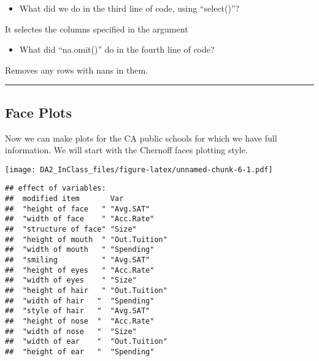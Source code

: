 \documentclass[]{article}
\newenvironment{Shaded}{\begin{snugshade}}{\end{snugshade}}
\newcommand{\DataTypeTok}[1]{\textcolor[rgb]{0.13,0.29,0.53}{#1}}
\newcommand{\KeywordTok}[1]{\textcolor[rgb]{0.13,0.29,0.53}{\textbf{#1}}}
\newcommand{\NormalTok}[1]{#1}
\newcommand{\OperatorTok}[1]{\textcolor[rgb]{0.81,0.36,0.00}{\textbf{#1}}}
\newcommand{\StringTok}[1]{\textcolor[rgb]{0.31,0.60,0.02}{#1}}
\providecommand{\tightlist}{%
  \setlength{\itemsep}{0pt}\setlength{\parskip}{0pt}}
\begin{document}
\begin{itemize}
\tightlist
\item
  What did we do in the third line of code, using ``select()''?
\end{itemize}

It selectes the columns specified in the argument

\begin{itemize}
\tightlist
\item
  What did ``na.omit()'' do in the fourth line of code?
\end{itemize}

Removes any rows with nans in them.

\begin{center}\rule{0.5\linewidth}{\linethickness}\end{center}

\hypertarget{face-plots}{%
\subsection{Face Plots}\label{face-plots}}

Now we can make plots for the CA public schools for which we have full
information. We will start with the Chernoff faces plotting style.

\begin{Shaded}
\end{Shaded}

\texttt{[image: DA2\_InClass\_files/figure-latex/unnamed-chunk-6-1.pdf]}

\begin{verbatim}
## effect of variables:
##  modified item       Var          
##  "height of face   " "Avg.SAT"    
##  "width of face    " "Acc.Rate"   
##  "structure of face" "Size"       
##  "height of mouth  " "Out.Tuition"
##  "width of mouth   " "Spending"   
##  "smiling          " "Avg.SAT"    
##  "height of eyes   " "Acc.Rate"   
##  "width of eyes    " "Size"       
##  "height of hair   " "Out.Tuition"
##  "width of hair   "  "Spending"   
##  "style of hair   "  "Avg.SAT"    
##  "height of nose  "  "Acc.Rate"   
##  "width of nose   "  "Size"       
##  "width of ear    "  "Out.Tuition"
##  "height of ear   "  "Spending"
\end{verbatim}
\end{document}
